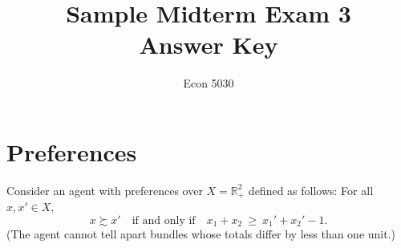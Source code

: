 \title{Sample Midterm Exam 3\ifsol\\[4pt]\large Answer Key\fi}
\author{Econ 5030}
\date{}


\maketitle
\thispagestyle{myheadings}

\section{Preferences}

\noindent Consider an agent with preferences over $X=\mathbb{R}^2_+$ defined as follows: For all $x,x'\in X$,
\[
x \succsim x' \quad\text{if and only if}\quad x_1+x_2 \ \ge\ x_1'+x_2'-1.
\]
(The agent cannot tell apart bundles whose totals differ by less than one unit.)

